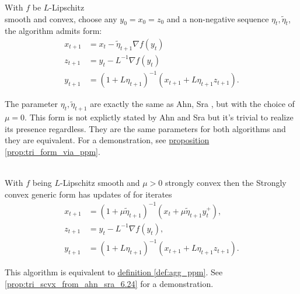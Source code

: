 \documentclass[12pt]{article}
\begin{document}
            \begin{definition}\label{def:agg_tri}
                With $f$ be $L$-Lipschitz \\ 
                smooth and convex, choose any $y_0 = x_0=z_0$ and a non-negative sequence $\eta_t, \tilde\eta_t$, the algorithm admits form: 
                \begin{align*}
                    x_{t + 1} &= x_t - \tilde \eta_{t + 1} \nabla f(y_t) 
                    \\
                    z_{t + 1} &= y_t - L^{-1} \nabla f(y_t) 
                    \\
                    y_{t + 1} &= 
                    (1 + L\eta_{t + 1})^{-1}
                    (
                    x_{t + 1} + L\eta_{t + 1}z_{t + 1}
                    ). 
                \end{align*}
            \end{definition}
            \begin{remark}
                The parameter $\eta_t, \tilde\eta_{t + 1}$ are exactly the same as Ahn, Sra \cite[(6.24)]{ahn_understanding_2022}, but with the choice of $\mu = 0$. 
                This form is not explictly stated by Ahn and Sra but it's trivial to realize its presence regardless. 
                They are the same parameters for both algorithms and they are equivalent. 
                For a demonstration, see 
                \hyperref[prop:tri_form_via_ppm]{proposition \ref*{prop:tri_form_via_ppm}}. 
            \end{remark}

            \begin{definition}
                \quad \\
                With $f$ being $L$-Lipschitz smooth and $\mu > 0$ strongly convex then the Strongly convex generic form has updates of for iterates
                \begin{align*}
                    x_{t + 1} &= (1 + \mu\tilde \eta_{t + 1})^{-1}(x_t + \mu\tilde\eta_{t + 1}y_t^+), 
                    \\
                    z_{t + 1} &= y_t - L^{-1}\nabla f(y_t), 
                    \\
                    y_{t + 1} &= (1 + L\eta_{t + 1})^{-1}(x_{t + 1} + L\eta_{t + 1}z_{t +1}). 
                \end{align*}
            \end{definition}
            \begin{remark}
                This algorithm is equivalent to 
                \hyperref[def:agg_ppm]{definition \ref*{def:agg_ppm}}. 
                See \ref*{prop:tri_scvx_from_ahn_sra_6.24} for a demonstration. 
            \end{remark}
\end{document}
